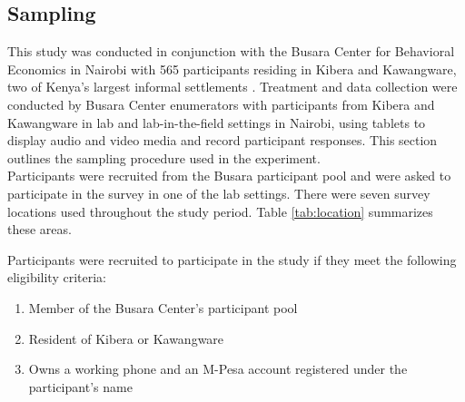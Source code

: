 \documentclass[11pt, a4paper]{article}\usepackage[]{graphicx}\usepackage[]{color}
\begin{document}
    \subsection{Sampling}

        This study was conducted in conjunction with the Busara Center for Behavioral Economics in Nairobi with 565 participants residing in Kibera and Kawangware, two of Kenya's largest informal settlements \parencite{haushofer_methodology_2014}. Treatment and data collection were conducted by Busara Center enumerators with participants from Kibera and Kawangware in lab and lab-in-the-field settings in Nairobi, using tablets to display audio and video media and record participant responses. This section outlines the sampling procedure used in the experiment. \\

        Participants were recruited from the Busara participant pool and were asked to participate in the survey in one of the lab settings. There were seven survey locations used throughout the study period. Table \ref{tab:location} summarizes these areas. 

        \begin{table}[h]
        \centering
        \caption{Survey location}
        \label{tab:location}
        \end{table}

Participants were recruited to participate in the study if they meet the following eligibility criteria:

        \begin{enumerate}
        \itemsep0em 
            \item Member of the Busara Center's participant pool
            \item Resident of Kibera or Kawangware
            \item Owns a working phone and an M-Pesa account registered under the participant's name
        \end{enumerate}
\end{document}
